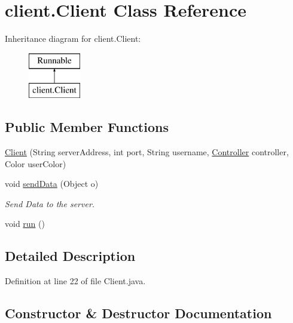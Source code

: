 \hypertarget{classclient_1_1_client}{}\section{client.\+Client Class Reference}
\label{classclient_1_1_client}
Inheritance diagram for client.\+Client\+:\begin{figure}[H]
\begin{center}
\leavevmode
\includegraphics[height=2.000000cm]{classclient_1_1_client}
\end{center}
\end{figure}
\subsection*{Public Member Functions}
\begin{DoxyCompactItemize}
\item 
\hyperlink{classclient_1_1_client_a85d8183914ca2a3444baf7599ff3d142}{Client} (String server\+Address, int port, String username, \hyperlink{classsample_1_1_controller}{Controller} controller, Color user\+Color)
\item 
void \hyperlink{classclient_1_1_client_a81b53ebbce32b100fbdb3835c57583d9}{send\+Data} (Object o)
\begin{DoxyCompactList}\small\item\em Send Data to the server. \end{DoxyCompactList}\item 
void \hyperlink{classclient_1_1_client_af1d54c5ce231e58cacd819675c3f98ab}{run} ()
\end{DoxyCompactItemize}


\subsection{Detailed Description}


Definition at line 22 of file Client.\+java.



\subsection{Constructor \& Destructor Documentation}
